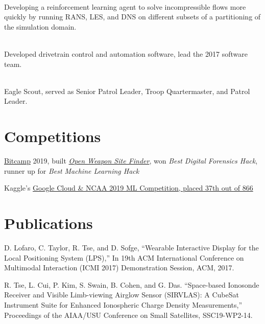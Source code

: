 \documentclass[]{deedy-resume-openfont}
\begin{document}
\begin{minipage}[t]{0.66\textwidth}
 \\
Developing a reinforcement learning agent to solve incompressible flows more quickly by running RANS, LES, and DNS on different subsets of a partitioning of the simulation domain.
\sectionsep

 \\
Developed drivetrain control and automation software, lead the 2017 software team.
\sectionsep

\vspace{-0.35cm}

 \\
Eagle Scout, served as Senior Patrol Leader, Troop Quartermaster, and Patrol Leader.
\sectionsep

\section{Competitions} 
\vspace{0.25cm}
\begin{tightemize}
    \item \href{https://bit.camp/}{Bitcamp} 2019, built \href{https://devpost.com/software/owsf}{\textit{Open Weapon Site Finder}}, won \textit{Best Digital Forensics Hack}, runner up for \textit{Best Machine Learning Hack}
    \item Kaggle's \href{https://www.kaggle.com/c/mens-machine-learning-competition-2019/leaderboard}{Google Cloud \& NCAA 2019 ML Competition, placed 37th out of 866}
\end{tightemize}
\sectionsep

\section{Publications}
\vspace{0.75cm}

\begin{thebibliography}{2}
D. Lofaro, C. Taylor, R. Tse, and D. Sofge, “Wearable Interactive Display for the Local Positioning System (LPS),” In 19th ACM International Conference on Multimodal Interaction (ICMI 2017) Demonstration Session, ACM, 2017.

R. Tse, L. Cui, P. Kim, S. Swain, B. Cohen, and G. Das. “Space-based Ionosonde Receiver and Visible Limb-viewing Airglow Sensor (SIRVLAS): A CubeSat Instrument Suite for Enhanced Ionospheric Charge Density Measurements,” Proceedings of the AIAA/USU Conference on Small Satellites, SSC19-WP2-14.
 
\end{thebibliography}

\end{minipage} 
\end{document}
